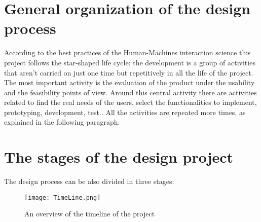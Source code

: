 \section{ General organization of the design process }
According to the best practices of the Human-Machines interaction science this project follows the star-shaped life cycle: the development is a group of activities that aren't carried on just one time but repetitively in all the life of the project. The most important activity is the evaluation of the product under the usability and the feasibility points of view. Around this central activity there are activities related to find the real needs of the users, select the functionalities to implement, prototyping, development, test.. All the activities are repeated more times, as explained in the following paragraph.    

\section{The stages of the design project}

The design process can be also divided in three stages:

\begin{figure}[H]
\centering
\texttt{[image: TimeLine.png]} 
\caption{An overview of the timeline of the project}
\end{figure}


